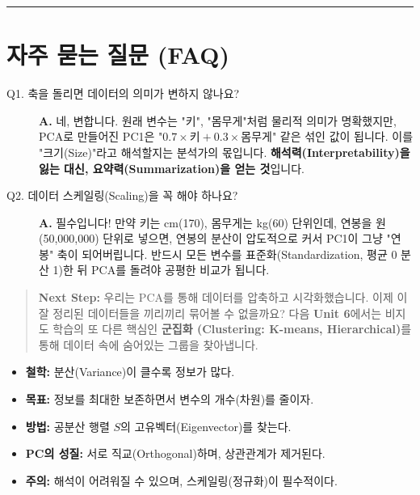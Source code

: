 \documentclass[11pt,a4paper]{book}
\theoremstyle{definition}
\begin{document}
\vspace{0.5cm}\hrule\vspace{0.5cm}

\section{자주 묻는 질문 (FAQ)}

\begin{description}
    \item[Q1. 축을 돌리면 데이터의 의미가 변하지 않나요?]
    \textbf{A.} 네, 변합니다. 원래 변수는 "키", "몸무게"처럼 물리적 의미가 명확했지만, PCA로 만들어진 PC1은 "$0.7 \times \text{키} + 0.3 \times \text{몸무게}$" 같은 섞인 값이 됩니다. 이를 "크기(Size)"라고 해석할지는 분석가의 몫입니다. \textbf{해석력(Interpretability)을 잃는 대신, 요약력(Summarization)을 얻는 것}입니다.
    
    \item[Q2. 데이터 스케일링(Scaling)을 꼭 해야 하나요?]
    \textbf{A.} 필수입니다! 만약 키는 cm(170), 몸무게는 kg(60) 단위인데, 연봉을 원(50,000,000) 단위로 넣으면, 연봉의 분산이 압도적으로 커서 PC1이 그냥 "연봉" 축이 되어버립니다. 반드시 모든 변수를 표준화(Standardization, 평균 0 분산 1)한 뒤 PCA를 돌려야 공평한 비교가 됩니다.
\end{description}

\vspace{1cm}
\begin{quote}
\textbf{Next Step:} 우리는 PCA를 통해 데이터를 압축하고 시각화했습니다. 이제 이 잘 정리된 데이터들을 끼리끼리 묶어볼 수 없을까요? 다음 \textbf{Unit 6}에서는 비지도 학습의 또 다른 핵심인 \textbf{군집화 (Clustering: K-means, Hierarchical)}를 통해 데이터 속에 숨어있는 그룹을 찾아냅니다.
\end{quote}

\begin{summarybox}[title={Unit 5 핵심 요약}]
\begin{itemize}
    \item \textbf{철학:} 분산(Variance)이 클수록 정보가 많다.
    \item \textbf{목표:} 정보를 최대한 보존하면서 변수의 개수(차원)를 줄이자.
    \item \textbf{방법:} 공분산 행렬 $S$의 고유벡터(Eigenvector)를 찾는다.
    \item \textbf{PC의 성질:} 서로 직교(Orthogonal)하며, 상관관계가 제거된다.
    \item \textbf{주의:} 해석이 어려워질 수 있으며, 스케일링(정규화)이 필수적이다.
\end{itemize}
\end{summarybox}
\end{document}
